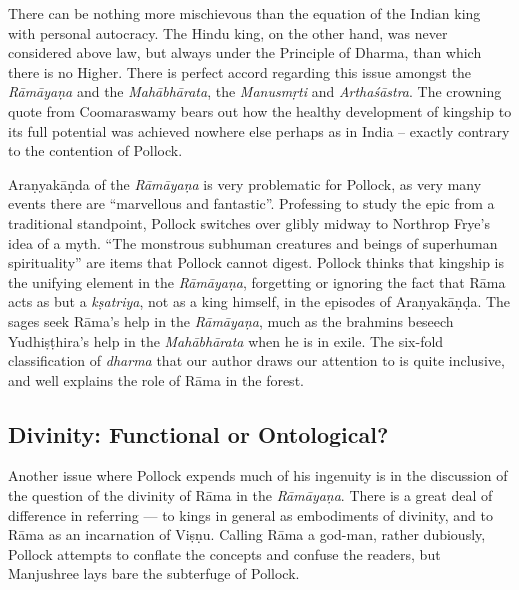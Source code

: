 There can be nothing more mischievous than the equation of the Indian king with personal autocracy. The Hindu king, on the other hand, was never considered above law, but always under the Principle of Dharma, than which there is no Higher. There is perfect accord regarding this issue amongst the {\sl Rāmāyaṇa} and the {\sl Mahābhārata}, the {\sl Manusmṛti} and {\sl Arthaśāstra}. The crowning quote from Coomaraswamy bears out how the healthy development of kingship to its full potential was achieved nowhere else perhaps as in India -- exactly contrary to the contention of Pollock.

Araṇyakāṇda of the {\sl Rāmāyaṇa} is very problematic for Pollock, as very many events there are “marvellous and fantastic”. Professing to study the epic from a traditional standpoint, Pollock switches over glibly midway to Northrop Frye's idea of a myth. ``The monstrous subhuman creatures and beings of superhuman spirituality'' are items that Pollock cannot digest. Pollock thinks that kingship is the unifying element in the {\sl Rāmāyaṇa}, forgetting or ignoring the fact that Rāma acts as but a {\sl kṣatriya}, not as a king himself, in the episodes of Araṇyakāṇḍa. The sages seek Rāma's help in the {\sl Rāmāyaṇa}, much as the brahmins beseech Yudhiṣṭhira's help in the {\sl Mahābhārata} when he is in exile. The six-fold classification of {\sl dharma} that our author draws our attention to is quite inclusive, and well explains the role of Rāma in the forest.\\[-20pt]

\subsection*{Divinity: Functional or Ontological?}

Another issue where Pollock expends much of his ingenuity is in the discussion of the question of the divinity of Rāma in the {\sl Rāmāyaṇa}. There is a great deal of difference in referring --- to kings in general as embodiments of divinity, and to Rāma as an incarnation of Viṣṇu. Calling Rāma a god-man, rather dubiously, Pollock attempts to conflate the concepts and confuse the readers, but Manjushree lays bare the subterfuge of Pollock.

